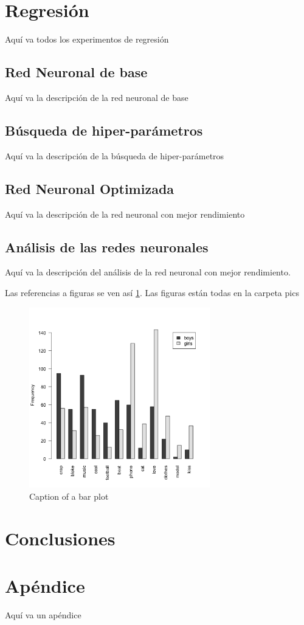 \documentclass[a4paper,12pt]{article}
\begin{document}
\section{Regresión}
\label{sec:reg}
Aquí va todos los experimentos de regresión  

\subsection{Red Neuronal de base}
\label{sec:regRedBase}
Aquí va la descripción de la red neuronal de base

\subsection{Búsqueda de hiper-parámetros}
\label{sec:regHiper}
Aquí va la descripción de la búsqueda de hiper-parámetros

\subsection{Red Neuronal Optimizada}
\label{sec:regRedOpt}
Aquí va la descripción de la red neuronal con mejor rendimiento

\subsection{Análisis de las redes neuronales}
\label{sec:regAn}
Aquí va la descripción del análisis de la red neuronal con mejor rendimiento.

Las referencias a figuras se ven así \ref{fig:bpr}. Las figuras están todas en la carpeta pics

\begin{figure}[htbp] \begin{center}
\includegraphics[width=0.7\textwidth]{pics/boysgirls.png}
\caption{Caption of a bar plot} \label{fig:bpr}
\end{center} \end{figure}

\section{Conclusiones}
\label{sec:con}


\printbibliography

\clearpage
\appendix
\section{Apéndice} \label{app:freq}
Aquí va un apéndice
\end{document}
